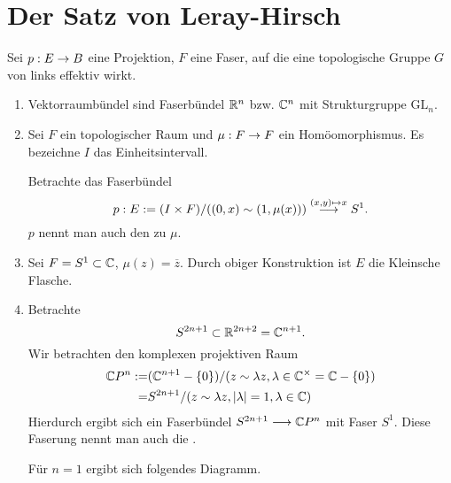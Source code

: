 

\section{Der Satz von Leray-Hirsch}

\Bsp{}
Sei $p:E \overset{}{\rightarrow} B$ eine Projektion, $F$ eine Faser, auf die eine topologische Gruppe $G$ von links effektiv wirkt.
\begin{enumerate}[(1)]
	\item Vektorraumbündel sind Faserbündel $\mathbb{R}^n$ bzw. $\mathbb{C}^n$ mit Strukturgruppe $\mathrm{GL}_n$.
	\item Sei $F$ ein topologischer Raum und $\mu : F \overset{}{\rightarrow} F$ ein Homöomorphismus. Es bezeichne $I$ das Einheitsintervall.
	
	Betrachte das Faserbündel
	\[ p : E:= (I \times F)/((0,x) \sim (1, \mu(x))) \overset{(x,y) \mapsto x}{\longrightarrow} S^1. \]
	$p$ nennt man auch den  zu $\mu$.
	\item Sei $ F = S^1 \subset \mathbb{C}$, $\mu (z) = \overline{z}$. Durch obiger Konstruktion ist $E$ die Kleinsche Flasche.
	\item Betrachte
	\[ S^{2n+1} \subset \mathbb{R}^{2n+2} = \mathbb{C}^{n+1}. \]
	Wir betrachten den komplexen projektiven Raum
	\begin{align*}
	\mathbb{C} P^n :=&	(\mathbb{C}^{n+1} - \{0\}) / (z\sim \lambda z,\lambda \in \mathbb{C}^\times = \mathbb{C} - \{0\})\\
	=& S^{2n+1} / (z \sim \lambda z,
	\left|\lambda\right| = 1, \lambda \in \mathbb{C}
	 ) 
	\end{align*}
	Hierdurch ergibt sich ein Faserbündel $S^{2n+1} \overset{}{\longrightarrow} \mathbb{C} P^n$ mit Faser $S^1$. Diese Faserung nennt man auch die .
	
	
 	Für $n = 1$ ergibt sich folgendes Diagramm.
 	\begin{center}
 	\end{center}
\end{enumerate}

